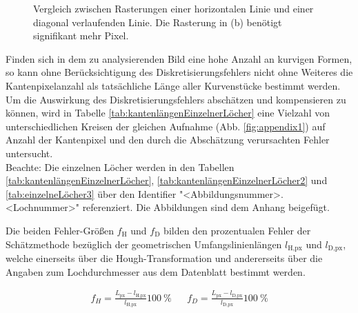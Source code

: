 \documentclass[accentcolor=tud1c, 11pt, toc=bib, toc=listof, captions=abovetable, parskip=half]{tudreport}
\begin{document}
\def\pixelsHorizontal{
  {1,1,1,1,1,1,1,1,1,1,1},
  {1,1,1,1,1,1,1,1,1,1,1},
  {1,1,1,1,1,1,1,1,1,1,1},
  {1,0,0,0,0,0,0,0,0,0,1},
  {1,1,1,1,1,1,1,1,1,1,1},
  {1,1,1,1,1,1,1,1,1,1,1},
  {1,1,1,1,1,1,1,1,1,1,1}%
}

\def\pixelsDiagonal{
  {1,1,1,1,1,1,1,1,1},
  {1,1,1,1,1,1,1,0,0},
  {1,1,1,1,1,0,0,0,1},
  {1,1,1,1,0,0,1,1,1},
  {1,1,0,0,1,1,1,1,1},
  {1,0,0,1,1,1,1,1,1},
  {0,0,1,1,1,1,1,1,1}%
}

\begin{figure}[h!]
    \centering
    
    \caption{Vergleich zwischen Rasterungen einer horizontalen Linie und einer diagonal verlaufenden Linie. Die Rasterung in (b) benötigt signifikant mehr Pixel.}
\end{figure}

Finden sich in dem zu analysierenden Bild eine hohe Anzahl an kurvigen Formen, so kann ohne Berücksichtigung des Diskretisierungsfehlers nicht ohne Weiteres die Kantenpixelanzahl als tatsächliche Länge aller Kurvenstücke bestimmt werden. 
Um die Auswirkung des Diskretisierungsfehlers abschätzen und kompensieren zu können, wird in Tabelle \ref{tab:kantenlängenEinzelnerLöcher} eine Vielzahl von unterschiedlichen Kreisen der gleichen Aufnahme (Abb. \ref{fig:appendix1}) auf Anzahl der Kantenpixel und den durch die Abschätzung verursachten Fehler untersucht.\\
Beachte: Die einzelnen Löcher werden in den Tabellen \ref{tab:kantenlängenEinzelnerLöcher}, \ref{tab:kantenlängenEinzelnerLöcher2} und \ref{tab:einzelneLöcher3} über den Identifier "<Abbildungsnummer>.<Lochnummer>" referenziert. Die Abbildungen sind dem Anhang beigefügt.

Die beiden Fehler-Größen $f_{\text{H}}$ und $f_{\text{D}}$ bilden den prozentualen Fehler der Schätzmethode bezüglich der geometrischen Umfangslinienlängen $l_{\text{H,px}}$ und $l_{\text{D,px}}$, welche einerseits über die Hough-Transformation und andererseits über die Angaben zum Lochdurchmesser aus dem Datenblatt bestimmt werden.

\begin{align}
f_H = \frac{L_{\text{px}}-l_{\text{H,px}}}{l_{\text{H,px}}}\SI{100}{\percent} && f_D = \frac{L_{\text{px}}-l_{\text{D,px}}}{l_{\text{D,px}}}\SI{100}{\percent}
\end{align}
\end{document}
